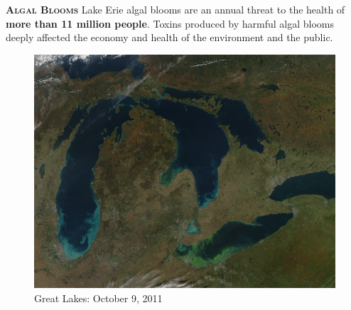 \documentclass[final,t]{beamer}
\begin{document}
\begin{frame}{}
		\begin{columns}
            \begin{column}{.33\linewidth}
                \begin{block}{\textsc{\textbf{Algal Blooms}}}
                  \vspace*{3mm}
                       Lake Erie algal blooms are an annual threat to the health
                       of \textbf{more than 11 million people}. Toxins produced
                       by harmful algal blooms  deeply affected the economy
                       and health of the environment and the public. %
                  \begin{figure}
                    \centering
                        \includegraphics[scale = 0.12]{assets/algalbloom.jpg}
                        \caption{Great Lakes: October 9, 2011}
                  \end{figure}


\end{block}
\end{column}
\end{columns}
\end{frame}
\end{document}

